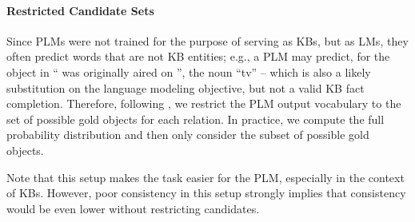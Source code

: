\paragraph{Restricted Candidate Sets}
Since PLMs were not trained for the purpose of
serving as KBs, but as LMs, they often predict words
that are not KB entities;
e.g., a PLM may predict, for the object in ``\subj{}
was originally aired on \obj{}'', the noun
``tv'' --  which is also a likely substitution on the language
modeling objective, but not a valid KB fact completion.
Therefore,
following \citep{Xiong2020Pretrained, nora@@},
we
restrict the PLM output vocabulary to the set of possible gold objects for each
relation. In practice, we compute the full probability
distribution and then only consider the subset of possible
gold objects.

Note that this setup makes the task easier for the PLM,
especially in the context of KBs. However, poor
consistency in this setup strongly implies that consistency
would be even lower without restricting candidates.
